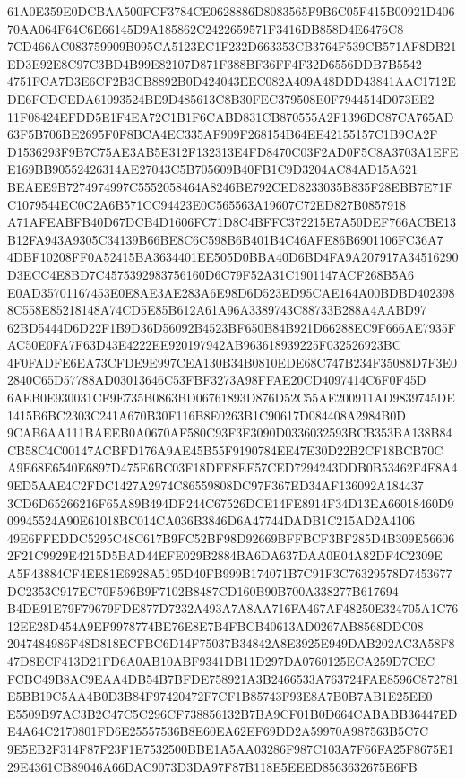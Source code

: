 \documentclass[UTF8,fontset=fandol,zihao=-4,a4paper]{ctexart}
\begin{document}
{{61A0E359E0DCBAA500FCF3784CE0628886D8083565F9B6C05F415B00921D40670AA064F64C6E66145D9A185862C2422659571F3416DB858D4E6476C8
7CD466AC083759909B095CA5123EC1F232D663353CB3764F539CB571AF8DB21ED3E92E8C97C3BD4B99E82107D871F388BF36FF4F32D6556DDB7B5542
4751FCA7D3E6CF2B3CB8892B0D424043EEC082A409A48DDD43841AAC1712EDE6FCDCEDA61093524BE9D485613C8B30FEC379508E0F7944514D073EE2
11F08424EFDD5E1F4EA72C1B1F6CABD831CB870555A2F1396DC87CA765AD63F5B706BE2695F0F8BCA4EC335AF909F268154B64EE42155157C1B9CA2F
D1536293F9B7C75AE3AB5E312F132313E4FD8470C03F2AD0F5C8A3703A1EFEE169BB90552426314AE27043C5B705609B40FB1C9D3204AC84AD15A621
BEAEE9B7274974997C5552058464A8246BE792CED8233035B835F28EBB7E71FC1079544EC0C2A6B571CC94423E0C565563A19607C72ED827B0857918
A71AFEABFB40D67DCB4D1606FC71D8C4BFFC372215E7A50DEF766ACBE13B12FA943A9305C34139B66BE8C6C598B6B401B4C46AFE86B6901106FC36A7
4DBF10208FF0A52415BA3634401EE505D0BBA40D6BD4FA9A207917A34516290D3ECC4E8BD7C4575392983756160D6C79F52A31C1901147ACF268B5A6
E0AD35701167453E0E8AE3AE283A6E98D6D523ED95CAE164A00BDBD4023988C558E85218148A74CD5E85B612A61A96A3389743C88733B288A4AABD97
62BD5444D6D22F1B9D36D56092B4523BF650B84B921D66288EC9F666AE7935FAC50E0FA7F63D43E4222EE920197942AB963618939225F032526923BC
4F0FADFE6EA73CFDE9E997CEA130B34B0810EDE68C747B234F35088D7F3E02840C65D57788AD03013646C53FBF3273A98FFAE20CD4097414C6F0F45D
6AEB0E930031CF9E735B0863BD06761893D876D52C55AE200911AD9839745DE1415B6BC2303C241A670B30F116B8E0263B1C90617D084408A2984B0D
9CAB6AA111BAEEB0A0670AF580C93F3F3090D0336032593BCB353BA138B84CB58C4C00147ACBFD176A9AE45B55F9190784EE47E30D22B2CF18BCB70C
A9E68E6540E6897D475E6BC03F18DFF8EF57CED7294243DDB0B53462F4F8A49ED5AAE4C2FDC1427A2974C86559808DC97F367ED34AF136092A184437
3CD6D65266216F65A89B494DF244C67526DCE14FE8914F34D13EA66018460D909945524A90E61018BC014CA036B3846D6A47744DADB1C215AD2A4106
49E6FFEDDC5295C48C617B9FC52BF98D92669BFFBCF3BF285D4B309E566062F21C9929E4215D5BAD44EFE029B2884BA6DA637DAA0E04A82DF4C2309E
A5F43884CF4EE81E6928A5195D40FB999B174071B7C91F3C76329578D7453677DC2353C917EC70F596B9F7102B8487CD160B90B700A338277B617694
B4DE91E79F79679FDE877D7232A493A7A8AA716FA467AF48250E324705A1C7612EE28D454A9EF9978774BE76E8E7B4FBCB40613AD0267AB8568DDC08
2047484986F48D818ECFBC6D14F75037B34842A8E3925E949DAB202AC3A58F847D8ECF413D21FD6A0AB10ABF9341DB11D297DA0760125ECA259D7CEC
FCBC49B8AC9EAA4DB54B7BFDE758921A3B2466533A763724FAE8596C872781E5BB19C5AA4B0D3B84F97420472F7CF1B85743F93E8A7B0B7AB1E25EE0
E5509B97AC3B2C47C5C296CF738856132B7BA9CF01B0D664CABABB36447EDE4A64C2170801FD6E25557536B8E60EA62EF69DD2A59970A987563B5C7C
9E5EB2F314F87F23F1E7532500BBE1A5AA03286F987C103A7F66FA25F8675E129E4361CB89046A66DAC9073D3DA97F87B118E5EEED8563632675E6FB
}}
\end{document}
